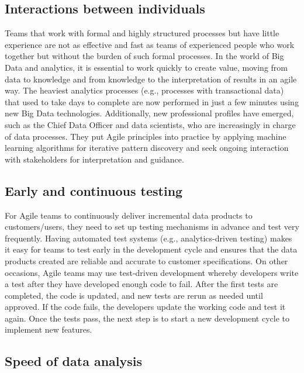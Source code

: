 \documentclass[
  letterpaper,
  DIV=11,
  numbers=noendperiod]{scrreprt}
\begin{document}
\hypertarget{interactions-between-individuals}{%
\subsection{Interactions between
individuals}\label{interactions-between-individuals}}

Teams that work with formal and highly structured processes but have
little experience are not as effective and fast as teams of experienced
people who work together but without the burden of such formal
processes. In the world of Big Data and analytics, it is essential to
work quickly to create value, moving from data to knowledge and from
knowledge to the interpretation of results in an agile way. The heaviest
analytics processes (e.g., processes with transactional data) that used
to take days to complete are now performed in just a few minutes using
new Big Data technologies. Additionally, new professional profiles have
emerged, such as the Chief Data Officer and data scientists, who are
increasingly in charge of data processes. They put Agile principles into
practice by applying machine learning algorithms for iterative pattern
discovery and seek ongoing interaction with stakeholders for
interpretation and guidance.

\hypertarget{early-and-continuous-testing}{%
\subsection{Early and continuous
testing}\label{early-and-continuous-testing}}

For Agile teams to continuously deliver incremental data products to
customers/users, they need to set up testing mechanisms in advance and
test very frequently. Having automated test systems (e.g.,
analytics-driven testing) makes it easy for teams to test early in the
development cycle and ensures that the data products created are
reliable and accurate to customer specifications. On other occasions,
Agile teams may use test-driven development whereby developers write a
test after they have developed enough code to fail. After the first
tests are completed, the code is updated, and new tests are rerun as
needed until approved. If the code fails, the developers update the
working code and test it again. Once the tests pass, the next step is to
start a new development cycle to implement new features.

\hypertarget{speed-of-data-analysis}{%
\subsection{Speed of data analysis}\label{speed-of-data-analysis}}
\end{document}
